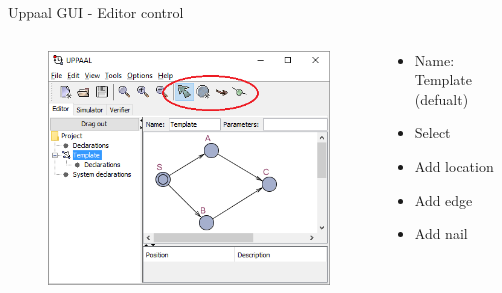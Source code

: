 \documentclass{beamer}
\begin{document}
\begin{frame}{Uppaal GUI - Editor control}
	\vspace{-10mm}
	\begin{columns}
		\begin{column}{0.8\textwidth}
			\begin{figure}[H]
				\includegraphics[scale=0.7]{img/uppaal_gui_small_editor_control.png}
			\end{figure}
		\end{column}
		
		\begin{column}{0.3\textwidth}
			\begin{itemize}
				\item Name: Template (defualt)
				\item Select
				\item Add location
				\item Add edge
				\item Add nail
			\end{itemize}
		\end{column}
	\end{columns}		
\end{frame}
\end{document}
